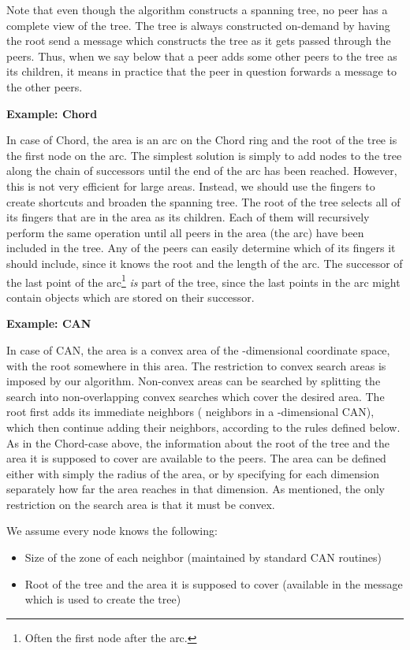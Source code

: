 \documentclass[fleqn,12pt,twoside]{article}
\begin{document}
Note that even though the algorithm constructs a spanning tree, no
peer has a complete view of the tree. The tree is always constructed
on-demand by having the root send a message which constructs the tree
as it gets passed through the peers. Thus, when we say below that a
peer adds some other peers to the tree as its children, it means in
practice that the peer in question forwards a message to the other
peers.

\noindent
\textbf{Example: Chord}

In case of Chord, the area is an arc on the Chord ring and the root of
the tree is the first node on the arc. The simplest solution is simply
to add nodes to the tree along the chain of successors until the end
of the arc has been reached. However, this is not very efficient for
large areas. Instead, we should use the fingers to create shortcuts
and broaden the spanning tree. The root of the tree selects all of its
fingers that are in the area as its children. Each of them will
recursively perform the same operation until all peers in the area
(the arc) have been included in the tree. Any of the peers can easily
determine which of its fingers it should include, since it knows the
root and the length of the arc. The successor of the last point of the
arc\footnote{Often the first node after the arc.} \emph{is} part of
the tree, since the last points in the arc might contain objects which
are stored on their successor.


\noindent
\textbf{Example: CAN}

In case of CAN, the area is a convex area of the -dimensional
coordinate space, with the root somewhere in this area. The
restriction to convex search areas is imposed by our algorithm.
Non-convex areas can be searched by splitting the search into
non-overlapping convex searches which cover the desired area. The root
first adds its immediate neighbors ( neighbors in a
-dimensional CAN), which then continue adding their neighbors,
according to the rules defined below.  As in the Chord-case above, the
information about the root of the tree and the area it is supposed to
cover are available to the peers.  The area can be defined either with
simply the radius of the area, or by specifying for each dimension
separately how far the area reaches in that dimension.  As mentioned,
the only restriction on the search area is that it must be convex.


We assume every node knows the following:
\begin{itemize}
\item Size of the zone of each neighbor (maintained by standard CAN
  routines)
\item Root of the tree and the area it is supposed to cover (available
  in the message which is used to create the tree)
\end{itemize}
\end{document}
